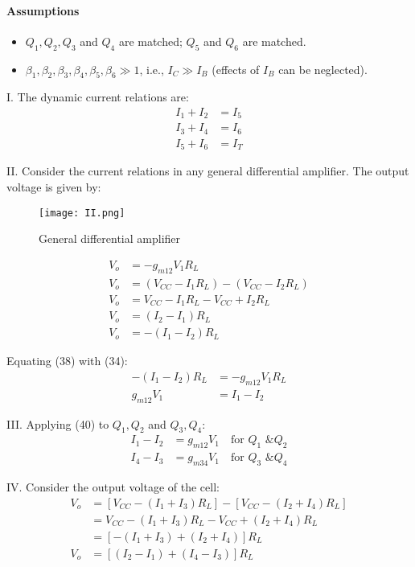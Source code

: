\documentclass[a4paper,9pt,twoside,openany,twocolumn]{memoir}
\begin{document}
\paragraph{Assumptions}
\begin{itemize}
    \item \( Q_1, Q_2, Q_3 \) and \( Q_4 \) are matched; \( Q_5 \) and \( Q_6 \) are matched.
    \item \( \beta_1, \beta_2, \beta_3, \beta_4, \beta_5, \beta_6 \gg 1 \), i.e., \( I_C \gg I_B \) (effects of \( I_B \) can be neglected).
\end{itemize}

I. The dynamic current relations are:
\begin{align}
I_1 + I_2 &= I_5 \tag{31} \\
I_3 + I_4 &= I_6 \tag{32} \\
I_5 + I_6 &= I_T \tag{33}
\end{align}

II. Consider the current relations in any general differential amplifier. The output voltage is given by:
\begin{figure}[h]
    \centering
    \texttt{[image: II.png]} %
    \caption{General differential amplifier}
    \label{fig:II}
\end{figure}
\begin{align}
V_o &= -g_{m12} V_1 R_L \tag{34} \\
V_o &= (V_{CC} - I_1 R_L) - (V_{CC} - I_2 R_L) \tag{35} \\
V_o &= V_{CC} - I_1 R_L - V_{CC} + I_2 R_L \tag{36} \\
V_o &= (I_2 - I_1) R_L \tag{37} \\
V_o &= -(I_1 - I_2) R_L \tag{38}
\end{align}

Equating (38) with (34):
\begin{align}
-(I_1 - I_2) R_L &= -g_{m12} V_1 R_L \tag{39} \\
g_{m12} V_1 &= I_1 - I_2 \tag{40}
\end{align}

III. Applying (40) to \( Q_1, Q_2 \) and \( Q_3, Q_4 \):
\begin{align}
I_1 - I_2 &= g_{m12} V_1 \quad \text{for } Q_1 \text{ \& } Q_2 \tag{41} \\
I_4 - I_3 &= g_{m34} V_1 \quad \text{for } Q_3 \text{ \& } Q_4 \tag{42}
\end{align}

IV. Consider the output voltage of the cell:
\begin{align}
V_o &= [V_{CC} - (I_1 + I_3)R_L] - [V_{CC} - (I_2 + I_4)R_L] \tag{43} \\
&= V_{CC} - (I_1 + I_3)R_L - V_{CC} + (I_2 + I_4)R_L \tag{44} \\
&= [-(I_1 + I_3) + (I_2 + I_4)] R_L \tag{45} \\
V_o &= [(I_2 - I_1) + (I_4 - I_3)] R_L \tag{46}
\end{align}
\end{document}
